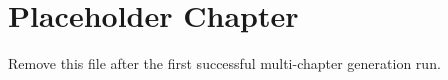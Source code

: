 \section{Placeholder Chapter}
\label{sec:placeholder}

Remove this file after the first successful multi-chapter generation run.
